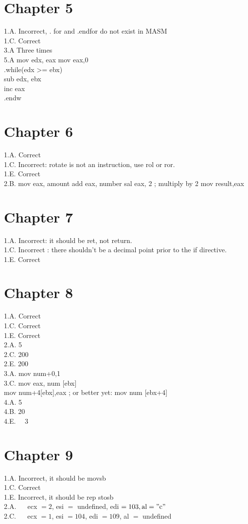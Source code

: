 \documentclass[10pt]{book}
\begin{document}
\section{Chapter 5}
1.A. Incorrect, . for and .endfor do not exist in MASM\\
1.C. Correct\\
3.A Three times\\
5.A mov edx, eax mov eax,0\\
.while(edx >= ebx)\\
sub edx, ebx\\
inc eax\\
.endw

\section{Chapter 6}
1.A. Correct\\
1.C. Incorrect: rotate is not an instruction, use rol or ror.\\
1.E. Correct\\
2.B. mov eax, amount add eax, number sal eax, 2 ; multiply by 2 mov result,eax

\section{Chapter 7}
1.A. Incorrect: it should be ret, not return.\\

1.C. Incorrect : there shouldn't be a decimal point prior to the if directive.\\
1.E. Correct

\section{Chapter 8}
1.A. Correct\\
1.C. Correct\\
1.E. Correct\\
2.A. 5\\
2.C. 200\\
2.E. 200\\
3.A. mov num+0,1\\[0pt]
3.C. mov eax, num [ebx]\\[0pt]
mov num+4[ebx],eax ; or better yet: mov num [ebx+4]\\
4.A. 5\\
4.B. 20\\
4.E. $\quad 3$

\section{Chapter 9}
1.A. Incorrect, it should be movsb\\
1.C. Correct\\
1.E. Incorrect, it should be rep stosb\\
2.A. $\quad$ ecx $=2$, esi $=$ undefined, edi $=103, \mathrm{al}=" \mathrm{c} "$\\
2.C. $\quad$ ecx $=1$, esi $=104$, edi $=109$, al $=$ undefined
\end{document}
